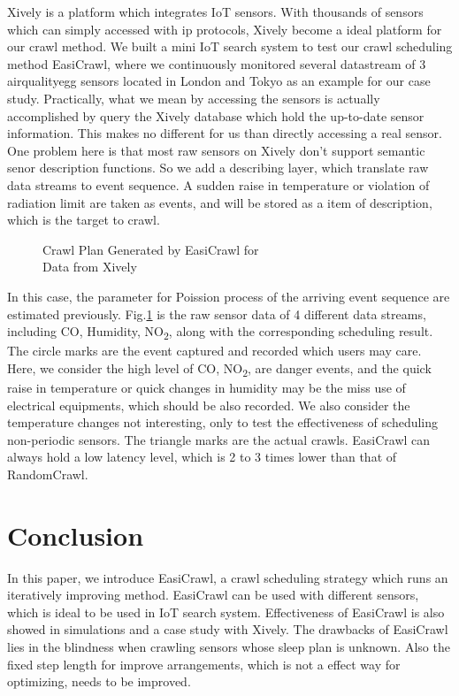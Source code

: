 \documentclass[conference]{IEEEtran}
\begin{document}
Xively is a platform which integrates IoT sensors. With thousands of sensors which can simply accessed with ip protocols, Xively become a ideal platform for our crawl method.
We built a mini IoT search system to test our crawl scheduling method EasiCrawl, where we continuously monitored several datastream of 3 airqualityegg\cite{airegg} sensors located in London and Tokyo as an example for our case study. 
Practically, what we mean by accessing the sensors is actually accomplished by query the Xively database which hold the up-to-date sensor information. This makes no different for us than directly accessing a real sensor. One problem here is that most raw sensors on Xively don't support semantic senor description functions. So we add a describing layer, which translate raw data streams to event sequence. A sudden raise in temperature or violation of radiation limit are taken as events, and will be stored as a item of description, which is the target to crawl.
\begin{figure}
	\centering
	
	\captionsetup{justification=centering}
	\caption{Crawl Plan Generated by EasiCrawl for \\
		Data from Xively}
	\label{fig:xivelycasestudy}
\end{figure}

In this case, the parameter for Poission process of the arriving event sequence are estimated previously.
Fig.\ref{fig:xivelycasestudy} is the raw sensor data of 4 different data streams, including CO, Humidity, NO\textsubscript{2}, along with the corresponding scheduling result. The circle marks are the event captured and recorded which users may care. Here, we consider the high level of CO, NO\textsubscript{2}, are danger events, and the quick raise in temperature or quick changes in humidity may be the miss use of electrical equipments, which should be also recorded. We also consider the temperature changes not interesting, only to test the effectiveness of scheduling non-periodic sensors.
The triangle marks are the actual crawls. EasiCrawl can always hold a low latency level, which is 2 to 3 times lower than that of RandomCrawl.

\section{Conclusion} \label{conclusion}

In this paper, we introduce EasiCrawl, a crawl scheduling strategy which runs an iteratively improving method. EasiCrawl can be used with different sensors, which is ideal to be used in IoT search system. Effectiveness of EasiCrawl is also showed in simulations and a case study with Xively. 
The drawbacks of EasiCrawl lies in the blindness when crawling sensors whose sleep plan is unknown. 
Also the fixed step length for improve arrangements, which is not a effect way for optimizing, needs to be improved.
\end{document}
